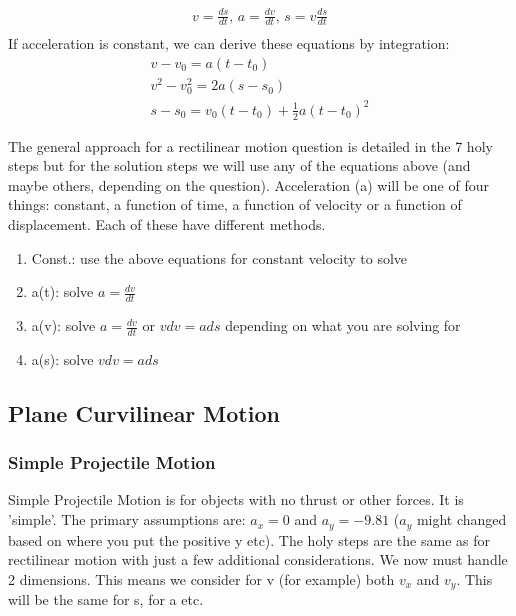 \documentclass[a4paper, 12pt]{article}
\begin{document}
\begin{align*}
    v = \frac{ds}{dt} \text{, }
    a = \frac{dv}{dt} \text{, }
    s = v\frac{ds}{dt}\\
\end{align*}
If acceleration is constant, we can derive these equations by integration:
\begin{align}
    v - v_0 = a(t-t_0) \\ 
    v^2 - v_0^2 = 2a(s-s_0) \\ 
    s - s_0 = v_0(t-t_0) + \frac{1}{2}a(t-t_0)^2
\end{align}

\noindent
The general approach for a rectilinear motion question is detailed in the 7 holy steps but for the solution
steps we will use any of the equations above (and maybe others, depending on the question). Acceleration (a) will 
be one of four things: constant, a function of time, a function of velocity or a function of displacement. Each
of these have different methods.

\begin{enumerate}
    \item Const.: use the above equations for constant velocity to solve 
    \item a(t): solve $a = \frac{dv}{dt}$
    \item a(v): solve $a = \frac{dv}{dt}$ or $vdv = ads$ depending on what you are solving for
    \item a(s): solve $vdv = ads$ 
\end{enumerate}

\begin{center}
\subsection*{Plane Curvilinear Motion}
\end{center}
\subsubsection*{Simple Projectile Motion}
Simple Projectile Motion is for objects with no thrust or other forces. It is 'simple'.
The primary assumptions are: $a_x=0$ and $a_y=-9.81$ ($a_y$ might changed based on where you put the positive y etc).
The holy steps are the same as for rectilinear motion with just a few additional considerations. 
We now must handle 2 dimensions. This means we consider for v (for example) both $v_x$ and $v_y$. 
This will be the same for s, for a etc.
\end{document}
